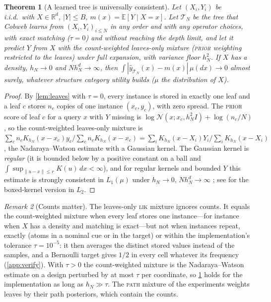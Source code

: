 \documentclass[11pt]{article}
\newtheorem{theorem}{Theorem}
\theoremstyle{definition}
\theoremstyle{remark}
\newtheorem{remark}[theorem]{Remark}
\newcommand{\R}{\mathbb{R}}
\newcommand{\E}{\mathbb{E}}
\newcommand{\N}{\mathcal{N}}
\newcommand{\T}{\mathcal{T}}
\newcommand{\hy}{\hat{y}}
\begin{document}
\begin{theorem}[A learned tree is universally consistent]\label{thm:consistency}
Let $(X_i,Y_i)$ be i.i.d.\ with $X\in\R^d$, $|Y|\le B$, $m(x)=\E[Y\mid X=x]$.
Let $\T_N$ be the tree that Cobweb learns from $(X_i,Y_i)_{i\le N}$ in any order and with
any operator choices, with exact matching ($\tau=0$) and without reaching the depth
limit, and let it predict $Y$ from $X$ with the \emph{count-weighted} leaves-only mixture
(\textsc{prior} weighting restricted to the leaves) under full expansion, with variance
floor $h_N^2$.  If $X$ has a density, $h_N\to0$ and $Nh_N^d\to\infty$, then
$\int|\hy_{\T_N}(x)-m(x)|\,\mu(dx)\to0$ almost surely, whatever structure category
utility builds ($\mu$ the distribution of $X$).
\end{theorem}
\begin{proof}
By \cref{lem:leaves} with $\tau=0$, every instance is stored in exactly one leaf and a
leaf $c$ stores $n_c$ copies of one instance $(x_c,y_c)$, with zero spread.  The
\textsc{prior} score of leaf $c$ for a query $x$ with $Y$ missing is
$\log\N(x;x_c,h_N^2I)+\log(n_c/N)$, so the count-weighted leaves-only mixture is
$\sum_cn_cK_{h_N}(x-x_c)y_c/\sum_cn_cK_{h_N}(x-x_c)=\sum_iK_{h_N}(x-X_i)Y_i/\sum_iK_{h_N}(x-X_i)$,
the Nadaraya--Watson estimate with a Gaussian kernel.  The Gaussian kernel is \emph{regular} (it is bounded below by a
positive constant on a ball and $\int\sup_{\|u-x\|\le r}K(u)\,dx<\infty$), and for
regular kernels and bounded $Y$ this estimate is strongly consistent in $L_1(\mu)$
under $h_N\to0$, $Nh_N^d\to\infty$ \citep{devroye1989}; see \citet[Ch.~5]{gyorfi2002}
for the boxed-kernel version in $L_2$.
\end{proof}

\begin{remark}[Counts matter]\label{rem:counts}
The leaves-only \textsc{lik} mixture ignores counts.  It equals the count-weighted mixture
when every leaf stores one instance---for instance when $X$ has a density and matching is
exact---but not when instances repeat, exactly (atoms in a nominal cue or in the target)
or within the implementation's tolerance $\tau=10^{-5}$: it then averages the distinct
stored values instead of the samples, and a Bernoulli target gives $1/2$ in every cell
whatever its frequency (\cref{app:verify}).  With $\tau>0$ the count-weighted mixture is the
Nadaraya--Watson estimate on a design perturbed by at most $\tau$ per coordinate, so
\cref{thm:consistency} holds for the implementation as long as $h_N\gg\tau$.  The
\textsc{path} mixture of the experiments weights leaves by their path posteriors, which
contain the counts.
\end{remark}
\end{document}
